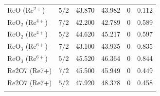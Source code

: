 \documentclass[12pt]{article}
\begin{document}
\begin{table}[H]
\begin{threeparttable}
\begin{tabular}{llrrrr}
$\mathrm{ReO}$ ($\mathrm{Re^{2+}}$) & $5/2$ & 43.870 & 43.982 & 0 & 0.112 \\
$\mathrm{ReO_2}$ ($\mathrm{Re^{4+}}$) & $7/2$ & 42.200 & 42.789 & 0 & 0.589 \\
$\mathrm{ReO_2}$ ($\mathrm{Re^{4+}}$) & $5/2$ & 44.620 & 45.217 & 0 & 0.597 \\
$\mathrm{ReO_3}$ ($\mathrm{Re^{6+}}$) & $7/2$ & 43.100 & 43.935 & 0 & 0.835 \\
$\mathrm{ReO_3}$ ($\mathrm{Re^{6+}}$) & $5/2$ & 45.520 & 46.364 & 0 & 0.844 \\
Re2O7 (Re7+) & $7/2$ & 45.500 & 45.949 & 0 & 0.449 \\
Re2O7 (Re7+) & $5/2$ & 47.920 & 48.378 & 0 & 0.458 \\
\addlinespace
\bottomrule
\end{tabular}
\end{threeparttable}
\end{table}
\end{document}
